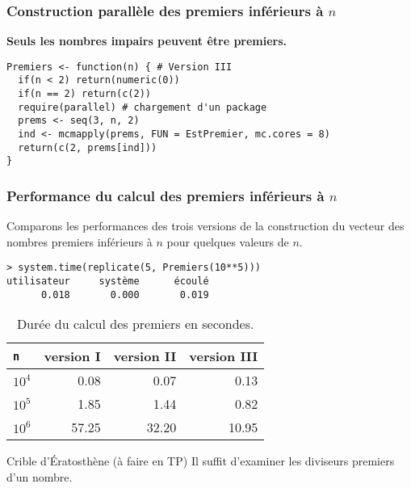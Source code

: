 \documentclass[10pt]{beamer}
\begin{document}
\begin{frame}[fragile]
  \frametitle{Construction parallèle des premiers inférieurs à $n$ }

  \textbf{Seuls les nombres impairs peuvent être premiers.}

\begin{lstlisting}[style=editor]
Premiers <- function(n) { # Version III
  if(n < 2) return(numeric(0))
  if(n == 2) return(c(2))
  require(parallel) # chargement d'un package
  prems <- seq(3, n, 2)
  ind <- mcmapply(prems, FUN = EstPremier, mc.cores = 8)
  return(c(2, prems[ind]))
}
\end{lstlisting}
\end{frame}



\begin{frame}[fragile]
  \frametitle{Performance du calcul des premiers inférieurs à $n$ }

  Comparons les performances des trois versions de la construction du vecteur des nombres premiers inférieurs à $n$ pour quelques valeurs de $n$.

  \begin{lstlisting}
> system.time(replicate(5, Premiers(10**5)))
utilisateur     système      écoulé
      0.018       0.000       0.019
  \end{lstlisting}

  \begin{table}[ht]
    \centering
    \begin{tabular}{l|rrr}
      \toprule
      \texttt{n} & version I & version II & version III \\
      \midrule
      $10^4$     & 0.08      & 0.07       & 0.13        \\
      $10^5$     & 1.85      & 1.44       & 0.82        \\
      $10^6$     & 57.25     & 32.20      & 10.95       \\
      \bottomrule
    \end{tabular}
    \caption{Durée du calcul des premiers en secondes.}
  \end{table}

  \begin{exampleblock}{Crible d'Ératosthène (à faire en TP)}
    Il suffit d'examiner les diviseurs premiers d'un nombre.
  \end{exampleblock}
\end{frame}
\end{document}
